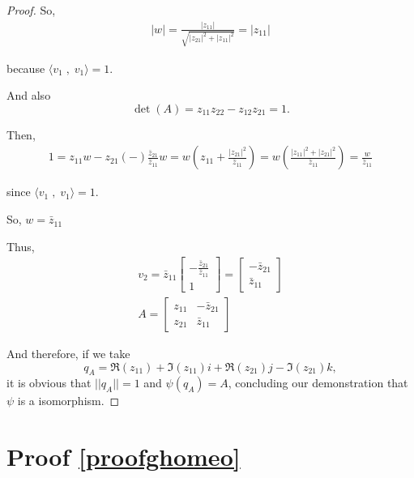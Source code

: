 \begin{proof}
So,
\begin{gather*}
    |w| = \frac{|z_{11}|}{\sqrt{|z_{21}|^2 + |z_{11}|^2}} = |z_{11}|
\end{gather*}

because $\langle v_1 \; , \; v_1 \rangle = 1$.

And also 
\begin{equation*}
    \det(A)=z_{11}z_{22}-z_{12}z_{21}=1.
\end{equation*}

Then,
\begin{gather*}
    1 = z_{11}w-z_{21}(-)\frac{\bar{z}_{21}}{\bar{z}_{11}}w = w \left( z_{11}+\frac{|{z}_{21}|^2}{\bar{z}_{11}} \right) = w \left( \frac{|{z}_{11}|^2+|{z}_{21}|^2}{\bar{z}_{11}} \right) = \frac{w}{\bar{z}_{11}}
\end{gather*}

since $\langle v_1 \; , \; v_1 \rangle = 1$.

So, $w = \bar{z}_{11}$

Thus,
\begin{gather*}
    v_2 = \bar{z}_{11} \begin{bmatrix}
    -\frac{\bar{z}_{21}}{\bar{z}_{11}}\\
    1
    \end{bmatrix} = \begin{bmatrix}
    -\bar{z}_{21}\\
    \bar{z}_{11}
    \end{bmatrix}\\
    A = \begin{bmatrix}
    z_{11} & -\bar{z}_{21}\\
    z_{21} & \bar{z}_{11}
    \end{bmatrix}
\end{gather*}

And therefore, if we take 
\begin{equation*}
q_{A} = \Re(z_{11}) + \Im(z_{11})i + \Re(z_{21})j - \Im(z_{21})k,
\end{equation*}
it is obvious that $||q_{A}||=1$ and $\psi (q_{A}) = A$, concluding our demonstration that $\psi$ is a isomorphism. 
\end{proof}


\section{Proof \ref{proofghomeo}}

